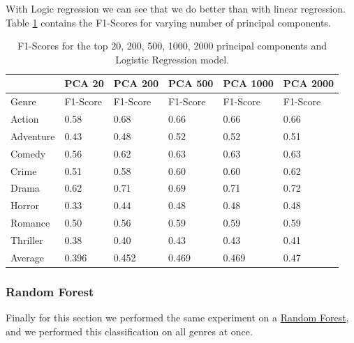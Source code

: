 \documentclass[11pt]{article}
\begin{document}
With Logic regression we can see that we do better than with linear regression. Table \ref{tab:logr_scores} contains the F1-Scores for varying number of principal components. 

\begin{table}[h]
	\label{tab:logr_scores}
\begin{center}
	\begin{tabular}{| l | l | l | l | l | l |}
		\hline		         
                  & PCA 20    & PCA 200           & PCA 500     & PCA 1000  & PCA 2000 \\\hline
        Genre     & F1-Score  & F1-Score          & F1-Score    & F1-Score  & F1-Score\\\hline		
	  	Action    & 0.58      & 0.68			  &  0.66       & 0.66     &  0.66\\
		Adventure & 0.43      & 0.48			  &  0.52       & 0.52     &  0.51\\
		Comedy    & 0.56      & 0.62			  &  0.63       & 0.63     &  0.63\\
		Crime     & 0.51      & 0.58			  &  0.60       & 0.60     &  0.62\\
		Drama     & 0.62      & 0.71			  &  0.69       & 0.71     &  0.72\\
		Horror    & 0.33      & 0.44			  &  0.48       & 0.48     &  0.48\\
		Romance   & 0.50      & 0.56			  &  0.59       & 0.59     &  0.59\\ 
		Thriller  & 0.38      & 0.40			  &  0.43       & 0.43     &  0.41\\\hline
		Average   & 0.396     & 0.452 			  & 0.469       & 0.469    &  0.47\\\hline       
	\end{tabular} 
\end{center}
	\caption{F1-Scores for the top 20, 200, 500, 1000, 2000 principal components and Logistic Regression model.}
\end{table}


\subsubsection{Random Forest}
Finally for this section we performed the same experiment on a \href{http://scikit-learn.org/stable/modules/generated/sklearn.ensemble.RandomForestClassifier.html}{Random Forest}, and we performed this classification on all genres at once. 
\end{document}
